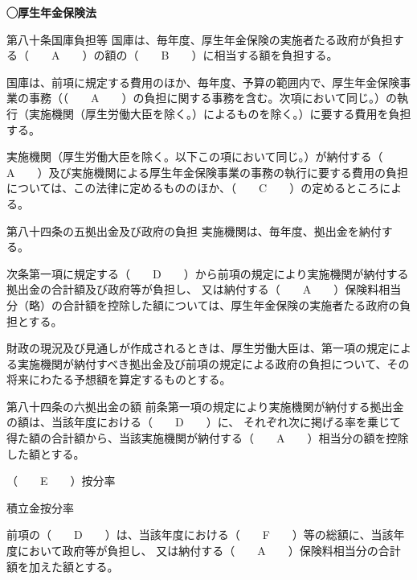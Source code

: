 \begin{fillblank}[数理人試験 2025 問題1 設問7]
  \noindent \textbf{◯厚生年金保険法}
  \begin{lawstructure}
    \begin{lawarticle}{第八十条}{国庫負担等}
      国庫は、毎年度、厚生年金保険の実施者たる政府が負担する（　　A　　）の額の（　　B　　）に相当する額を負担する。

      国庫は、前項に規定する費用のほか、毎年度、予算の範囲内で、厚生年金保険事業の事務（（　　A　　）の負担に関する事務を含む。次項において同じ。）の執行（実施機関（厚生労働大臣を除く。）によるものを除く。）に要する費用を負担する。

      実施機関（厚生労働大臣を除く。以下この項において同じ。）が納付する（　　A　　）及び実施機関による厚生年金保険事業の事務の執行に要する費用の負担については、この法律に定めるもののほか、（　　C　　）の定めるところによる。
    \end{lawarticle}

    \begin{lawarticle}{第八十四条の五}{拠出金及び政府の負担}
      実施機関は、毎年度、拠出金を納付する。

      次条第一項に規定する（　　D　　）から前項の規定により実施機関が納付する拠出金の合計額及び政府等が負担し、
      又は納付する（　　A　　）保険料相当分（略）の合計額を控除した額については、厚生年金保険の実施者たる政府の負担とする。

      財政の現況及び見通しが作成されるときは、厚生労働大臣は、第一項の規定による実施機関が納付すべき拠出金及び前項の規定による政府の負担について、その将来にわたる予想額を算定するものとする。
    \end{lawarticle}

    \begin{lawarticle}{第八十四条の六}{拠出金の額}
      前条第一項の規定により実施機関が納付する拠出金の額は、当該年度における（　　D　　）に、
      それぞれ次に掲げる率を乗じて得た額の合計額から、当該実施機関が納付する（　　A　　）相当分の額を控除した額とする。

      （　　E　　）按分率
      
      積立金按分率

      前項の（　　D　　）は、当該年度における（　　F　　）等の総額に、当該年度において政府等が負担し、
      又は納付する（　　A　　）保険料相当分の合計額を加えた額とする。
    
    \end{lawarticle}
  \end{lawstructure}  
\end{fillblank}

